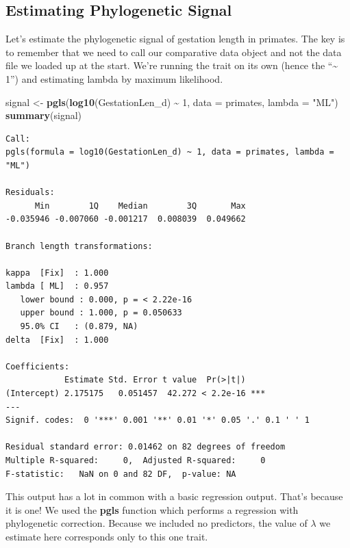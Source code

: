 \documentclass[
]{book}
\newenvironment{Shaded}{\begin{snugshade}}{\end{snugshade}}
\newcommand{\DataTypeTok}[1]{\textcolor[rgb]{0.13,0.29,0.53}{#1}}
\newcommand{\DecValTok}[1]{\textcolor[rgb]{0.00,0.00,0.81}{#1}}
\newcommand{\KeywordTok}[1]{\textcolor[rgb]{0.13,0.29,0.53}{\textbf{#1}}}
\newcommand{\NormalTok}[1]{#1}
\newcommand{\OperatorTok}[1]{\textcolor[rgb]{0.81,0.36,0.00}{\textbf{#1}}}
\newcommand{\StringTok}[1]{\textcolor[rgb]{0.31,0.60,0.02}{#1}}
\begin{document}
\hypertarget{estimating-phylogenetic-signal}{%
\subsection{Estimating Phylogenetic Signal}\label{estimating-phylogenetic-signal}}

Let's estimate the phylogenetic signal of gestation length in primates. The key is to remember that we need to call our comparative data object and not the data file we loaded up at the start. We're running the trait on its own (hence the ``\textasciitilde{} 1'') and estimating lambda by maximum likelihood.

\begin{Shaded}
\begin{Highlighting}[]
\NormalTok{signal \textless{}{-}}\StringTok{ }\KeywordTok{pgls}\NormalTok{(}\KeywordTok{log10}\NormalTok{(GestationLen\_d) }\OperatorTok{\textasciitilde{}}\StringTok{ }\DecValTok{1}\NormalTok{,}
               \DataTypeTok{data =}\NormalTok{ primates,}
               \DataTypeTok{lambda =} \StringTok{"ML"}\NormalTok{)}
\KeywordTok{summary}\NormalTok{(signal)}
\end{Highlighting}
\end{Shaded}

\begin{verbatim}
Call:
pgls(formula = log10(GestationLen_d) ~ 1, data = primates, lambda = "ML")

Residuals:
      Min        1Q    Median        3Q       Max 
-0.035946 -0.007060 -0.001217  0.008039  0.049662 

Branch length transformations:

kappa  [Fix]  : 1.000
lambda [ ML]  : 0.957
   lower bound : 0.000, p = < 2.22e-16
   upper bound : 1.000, p = 0.050633
   95.0% CI   : (0.879, NA)
delta  [Fix]  : 1.000

Coefficients:
            Estimate Std. Error t value  Pr(>|t|)    
(Intercept) 2.175175   0.051457  42.272 < 2.2e-16 ***
---
Signif. codes:  0 '***' 0.001 '**' 0.01 '*' 0.05 '.' 0.1 ' ' 1

Residual standard error: 0.01462 on 82 degrees of freedom
Multiple R-squared:     0,  Adjusted R-squared:     0 
F-statistic:   NaN on 0 and 82 DF,  p-value: NA 
\end{verbatim}

This output has a lot in common with a basic regression output. That's because it is one! We used the \textbf{pgls} function which performs a regression with phylogenetic correction. Because we included no predictors, the value of \(\lambda\) we estimate here corresponds only to this one trait.
\end{document}
